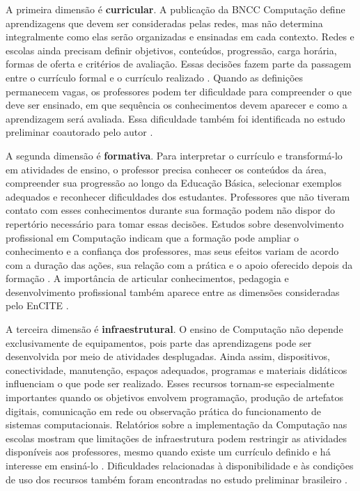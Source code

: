 A primeira dimensão é \textbf{curricular}. A publicação da BNCC Computação define aprendizagens que devem ser consideradas pelas redes, mas não determina integralmente como elas serão organizadas e ensinadas em cada contexto. Redes e escolas ainda precisam definir objetivos, conteúdos, progressão, carga horária, formas de oferta e critérios de avaliação. Essas decisões fazem parte da passagem entre o currículo formal e o currículo realizado \cite{remillard2014conceptualizing}. Quando as definições permanecem vagas, os professores podem ter dificuldade para compreender o que deve ser ensinado, em que sequência os conhecimentos devem aparecer e como a aprendizagem será avaliada. Essa dificuldade também foi identificada no estudo preliminar coautorado pelo autor \cite{santana2026desafios}.

A segunda dimensão é \textbf{formativa}. Para interpretar o currículo e transformá-lo em atividades de ensino, o professor precisa conhecer os conteúdos da área, compreender sua progressão ao longo da Educação Básica, selecionar exemplos adequados e reconhecer dificuldades dos estudantes. Professores que não tiveram contato com esses conhecimentos durante sua formação podem não dispor do repertório necessário para tomar essas decisões. Estudos sobre desenvolvimento profissional em Computação indicam que a formação pode ampliar o conhecimento e a confiança dos professores, mas seus efeitos variam de acordo com a duração das ações, sua relação com a prática e o apoio oferecido depois da formação \cite{ma2025effectiveness,liu2024bringing,mouza2022investigating}. A importância de articular conhecimentos, pedagogia e desenvolvimento profissional também aparece entre as dimensões consideradas pelo EnCITE \cite{vogel2024encite}.

A terceira dimensão é \textbf{infraestrutural}. O ensino de Computação não depende exclusivamente de equipamentos, pois parte das aprendizagens pode ser desenvolvida por meio de atividades desplugadas. Ainda assim, dispositivos, conectividade, manutenção, espaços adequados, programas e materiais didáticos influenciam o que pode ser realizado. Esses recursos tornam-se especialmente importantes quando os objetivos envolvem programação, produção de artefatos digitais, comunicação em rede ou observação prática do funcionamento de sistemas computacionais. Relatórios sobre a implementação da Computação nas escolas mostram que limitações de infraestrutura podem restringir as atividades disponíveis aos professores, mesmo quando existe um currículo definido e há interesse em ensiná-lo \cite{royal2017afterreboot}. Dificuldades relacionadas à disponibilidade e às condições de uso dos recursos também foram encontradas no estudo preliminar brasileiro \cite{santana2026desafios}.

